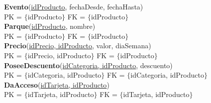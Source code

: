 \textbf{Evento}(\underline{idProducto}, fechaDesde, fechaHasta)\\
PK = $\lbrace$idProducto$\rbrace$ FK = $\lbrace$idProducto$\rbrace$\\
\textbf{Parque}(\underline{idProducto}, nombre)\\
PK = $\lbrace$idProducto$\rbrace$ FK = $\lbrace$idProducto$\rbrace$\\
\textbf{Precio}(\underline{idPrecio, idProducto}, valor, diaSemana)\\
PK = $\lbrace$idPrecio, idProducto$\rbrace$ FK = $\lbrace$idProducto$\rbrace$\\
\textbf{PoseeDescuento}(\underline{idCategoria, idProducto}, descuento)\\
PK = $\lbrace$idCategoria, idProducto$\rbrace$ FK = $\lbrace$idCategoria, idProducto$\rbrace$\\
\textbf{DaAcceso}(\underline{idTarjeta, idProducto})\\
PK = $\lbrace$idTarjeta, idProducto$\rbrace$ FK = $\lbrace$idTarjeta, idProducto$\rbrace$\\
